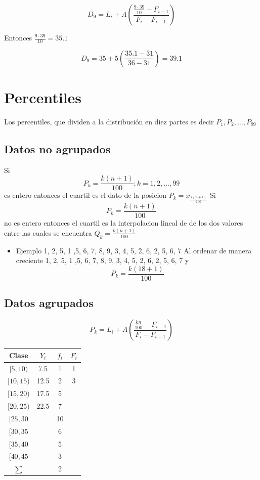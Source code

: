 \documentclass[
  11pt,
]{krantz}
\providecommand{\tightlist}{%
  \setlength{\itemsep}{0pt}\setlength{\parskip}{0pt}}
\theoremstyle{definition}
\theoremstyle{definition}
\theoremstyle{definition}
\theoremstyle{definition}
\theoremstyle{remark}
\begin{document}
\[D_9=L_i+ A\left(\frac{\frac{9\cdot 39}{10}-F_{i-1}}{F_i-F_{i-1}}\right)\]

Entonces \(\frac{9\cdot 39}{10}=35.1\)

\[D_9=35+ 5\left(\frac{35.1-31}{36-31}\right)=39.1\]

\hypertarget{percentiles}{%
\section{Percentiles}\label{percentiles}}

Los percentiles, que dividen a la distribución en diez partes es decir \(P_1, P_2,\ldots, P_{99}\)

\hypertarget{datos-no-agrupados-2}{%
\subsection{Datos no agrupados}\label{datos-no-agrupados-2}}

Si \[P_k=\frac{k(n+1)}{100}; k=1, 2,  \ldots, 99\] es entero entonces el cuartil es el dato de la posicion \(P_k=x_\frac{k(n+1)}{100}\) Si \[P_k=\frac{k(n+1)}{100}\] no es entero entonces el cuartil es la interpolacion lineal de de los dos valores entre las cuales se encuentra \(Q_k=\frac{k(n+1)}{100}\)

\begin{itemize}
\tightlist
\item
  Ejemplo 1, 2, 5, 1 ,5, 6, 7, 8, 9, 3, 4, 5, 2, 6, 2, 5, 6, 7 Al ordenar de manera creciente 1, 2, 5, 1 ,5, 6, 7, 8, 9, 3, 4, 5, 2, 6, 2, 5, 6, 7 y \[P_k=\frac{k(18+1)}{100}\]
\end{itemize}

\hypertarget{datos-agrupados-2}{%
\subsection{Datos agrupados}\label{datos-agrupados-2}}

\[P_k=L_i+ A\left(\frac{\frac{kn}{100}-F_{i-1}}{F_i-F_{i-1}}\right)\]

\begin{longtable}[]{@{}cccc@{}}
\toprule
Clase & \(Y_i\) & \(f_i\) & \(F_i\) \\
\midrule
\endhead
\([5,10)\) & 7.5 & 1 & 1 \\
\([10,15)\) & 12.5 & 2 & 3 \\
\([15,20)\) & 17.5 & 5 & \\
\([20,25)\) & 22.5 & 7 & \\
\([25,30\) & & 10 & \\
\([30,35\) & & 6 & \\
\([35,40\) & & 5 & \\
\([40,45\) & & 3 & \\
\(\sum\) & & 2 & \\
\bottomrule
\end{longtable}
\end{document}
